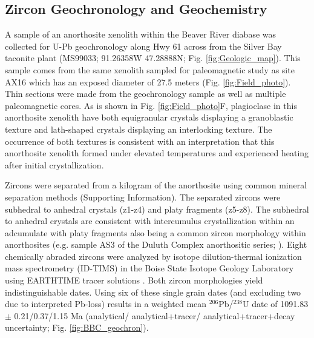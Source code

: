 \subsection{Zircon Geochronology and Geochemistry}

A sample of an anorthosite xenolith within the Beaver River diabase was collected for U-Pb geochronology along Hwy 61 across from the Silver Bay taconite plant (MS99033; 91.26358\textdegree W 47.28888\textdegree N; Fig. \ref{fig:Geologic_map}). This sample comes from the same xenolith sampled for paleomagnetic study as site AX16 which has an exposed diameter of 27.5 meters (Fig. \ref{fig:Field_photo}). Thin sections were made from the geochronology sample as well as multiple paleomagnetic cores. As is shown in Fig. \ref{fig:Field_photo}F, plagioclase in this anorthosite xenolith have both equigranular crystals displaying a granoblastic texture and lath-shaped crystals displaying an interlocking texture. The occurrence of both textures is consistent with an interpretation that this anorthosite xenolith formed under elevated temperatures and experienced heating after initial crystallization. 

Zircons were separated from a kilogram of the anorthosite using common mineral separation methods (Supporting Information). The separated zircons were subhedral to anhedral crystals (z1-z4) and platy fragments (z5-z8). The subhedral to anhedral crystals are consistent with intercumulus crystallization within an adcumulate with platy fragments also being a common zircon morphology within anorthosites (e.g. sample AS3 of the Duluth Complex anorthositic series; ). Eight chemically abraded zircons were analyzed by isotope dilution-thermal ionization mass spectrometry (ID-TIMS) in the Boise State Isotope Geology Laboratory using EARTHTIME tracer solutions \cite{Condon2015a}. Both zircon morphologies yield indistinguishable dates. Using six of these single grain dates (and excluding two due to interpreted Pb-loss) results in a weighted mean $^{206}$Pb/$^{238}$U date of 1091.83 $\pm$ 0.21/0.37/1.15 Ma (analytical/ analytical+tracer/ analytical+tracer+decay uncertainty; Fig. \ref{fig:BBC_geochron}). 

